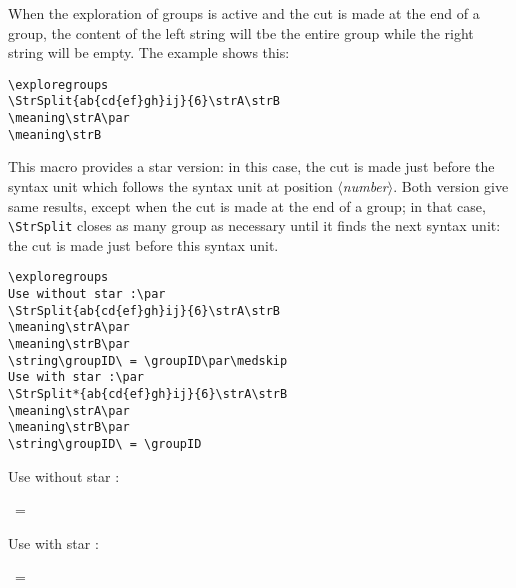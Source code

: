 \documentclass[english,a4paper,10pt]{article}
\newcommand\argu[1]{$\langle$\textit{#1}$\rangle$}
\newcommand\US{syntax unit\xspace}
\newcommand\styleexercice{\footnotesize}
\newcommand\verbinline{\lstinline[basicstyle=\normalsize\ttfamily]}
\begin{document}
When the exploration of groups is active and the cut is made at the end of a group, the content of the left string will tbe the entire group while the right string will be empty. The example shows this:\par\nobreak\smallskip
\begin{minipage}[c]{0.65\linewidth}
\hfill
\begin{lstlisting}
\exploregroups
\StrSplit{ab{cd{ef}gh}ij}{6}\strA\strB
\meaning\strA\par
\meaning\strB
\end{lstlisting}%
\end{minipage}\hfill
\begin{minipage}[c]{0.35\linewidth}
	\styleexercice
	\exploregroups
	\strA\strB
	\meaning\strA\par
	\meaning\strB
\end{minipage}%
\medskip

This macro provides a star version: in this case, the cut is made just before the \US which follows the \US at position \argu{number}. Both version give same results, except when the cut is made at the end of a group; in that case, \verbinline|\StrSplit| closes as many group as necessary until it finds the next \US: the cut is made just before this \US.\smallskip

\begin{minipage}[c]{0.65\linewidth}
\hfill
\begin{lstlisting}
\exploregroups
Use without star :\par
\StrSplit{ab{cd{ef}gh}ij}{6}\strA\strB
\meaning\strA\par
\meaning\strB\par
\string\groupID\ = \groupID\par\medskip
Use with star :\par
\StrSplit*{ab{cd{ef}gh}ij}{6}\strA\strB
\meaning\strA\par
\meaning\strB\par
\string\groupID\ = \groupID
\end{lstlisting}%
\end{minipage}\hfill
\begin{minipage}[c]{0.35\linewidth}
	\styleexercice
	\exploregroups
	Use without star :\par
	\strA\strB
	\meaning\strA\par
	\meaning\strB\par
	\string\groupID\ = \groupID\par\medskip
	Use with star :\par
	\strA\strB
	\meaning\strA\par
	\meaning\strB\par
	\string\groupID\ = \groupID
\end{minipage}%
\end{document}
